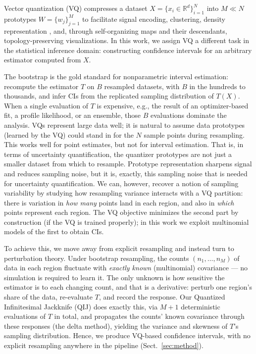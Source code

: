 \documentclass[runningheads]{llncs}
\begin{document}
Vector quantization (VQ) compresses a dataset $X = \{x_i \in \mathbb{R}^d\}_{i=1}^N$ into $M \ll N$ prototypes $W = \{w_j\}_{j=1}^M$ to facilitate signal encoding, clustering, density representation \cite{graf2000}, and, through self-organizing maps and their descendants, topology-preserving visualizations. In this work, we assign VQ a different task in the statistical inference domain: constructing confidence intervals for an arbitrary estimator computed from $X$.

The bootstrap \cite{efron1979} is the gold standard for nonparametric interval estimation: recompute the estimator $T$ on $B$ resampled datasets, with $B$ in the hundreds to thousands, and infer CIs from the replicated sampling distribution of $T(X)$. When a single evaluation of $T$ is expensive, e.g., the result of an optimizer-based fit, a profile likelihood, or an ensemble, those $B$ evaluations dominate the analysis. VQs represent large data well; it is natural to assume data prototypes (learned by the VQ) could stand in for the $N$ sample points during resampling. This works well for point estimates, but not for interval estimation. That is, in terms of uncertainty quantification, the quantizer prototypes are not just a smaller dataset from which to resample. Prototype representation sharpens signal and reduces sampling noise, but it is, exactly, this sampling noise that is needed for uncertainty quantification. We can, however, recover a notion of sampling variability by studying how resampling variance interacts with a VQ partition: there is variation in \emph{how many} points land in each region, and also in \emph{which} points represent each region. The VQ objective minimizes the second part by construction (if the VQ is trained properly); in this work we exploit multinomial models of the first to obtain CIs.

To achieve this, we move away from explicit resampling and instead turn to perturbation theory. Under bootstrap resampling, the counts $(n_1,\dots,n_M)$ of data in each region fluctuate with \emph{exactly known} (multinomial) covariance --- no simulation is required to learn it. The only unknown is how sensitive the estimator is to each changing count, and that is a derivative: perturb one region's share of the data, re-evaluate $T$, and record the response. Our Quantized Infinitesimal Jackknife (QIJ) does exactly this, via $M{+}1$ deterministic evaluations of $T$ in total, and propagates the counts' known covariance through these responses (the delta method), yielding the variance and skewness of $T$'s sampling distribution. Hence, we produce VQ-based confidence intervals, with no explicit resampling anywhere in the pipeline (Sect.~\ref{sec:method}).
\end{document}
